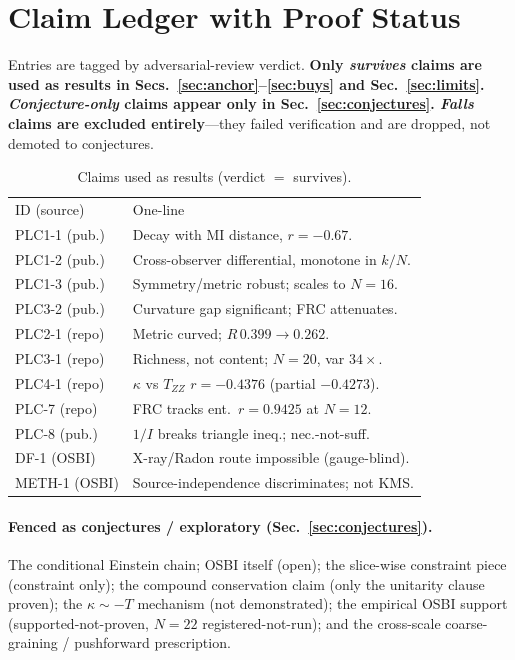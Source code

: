 \documentclass[aps,pra,twocolumn,superscriptaddress,floatfix]{revtex4-2}
\theoremstyle{definition}
\begin{document}
\appendix

\section{Claim Ledger with Proof Status}
\label{app:ledger}

Entries are tagged by adversarial-review verdict. \textbf{Only \emph{survives}
claims are used as results in Secs.~\ref{sec:anchor}--\ref{sec:buys} and
Sec.~\ref{sec:limits}. \emph{Conjecture-only} claims appear only in
Sec.~\ref{sec:conjectures}. \emph{Falls} claims are excluded entirely}---they
failed verification and are dropped, not demoted to conjectures.

\begin{table}[h]
\caption{Claims used as results (verdict $=$ survives).}
\label{tab:ledger}
\begin{ruledtabular}
\begin{tabular}{ll}
ID (source) & One-line \\
\colrule
PLC1-1 (pub.) & Decay with MI distance, $r=-0.67$. \\
PLC1-2 (pub.) & Cross-observer differential, monotone in $k/N$. \\
PLC1-3 (pub.) & Symmetry/metric robust; scales to $N=16$. \\
PLC3-2 (pub.) & Curvature gap significant; FRC attenuates. \\
PLC2-1 (repo) & Metric curved; $R\,0.399\!\to\!0.262$. \\
PLC3-1 (repo) & Richness, not content; $N=20$, var $34\times$. \\
PLC4-1 (repo) & $\kappa$ vs $T_{ZZ}$ $r=-0.4376$ (partial $-0.4273$). \\
PLC-7 (repo) & FRC tracks ent.\ $r=0.9425$ at $N=12$. \\
PLC-8 (pub.) & $1/I$ breaks triangle ineq.; nec.-not-suff. \\
DF-1 (OSBI) & X-ray/Radon route impossible (gauge-blind). \\
METH-1 (OSBI) & Source-independence discriminates; not KMS. \\
\end{tabular}
\end{ruledtabular}
\end{table}

\paragraph{Fenced as conjectures / exploratory (Sec.~\ref{sec:conjectures}).}
The conditional Einstein chain; OSBI itself (open); the slice-wise constraint
piece (constraint only); the compound conservation claim (only the unitarity
clause proven); the $\kappa\sim-T$ mechanism (not demonstrated); the empirical
OSBI support (supported-not-proven, $N=22$ registered-not-run); and the
cross-scale coarse-graining / pushforward prescription.
\end{document}
